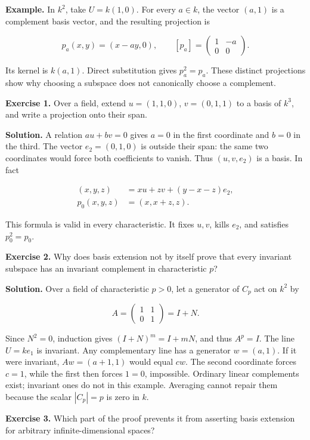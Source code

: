 \documentclass[
  english,
]{article}
\begin{document}
\textbf{Example.} In \(k^2\), take \(U=k(1,0)\). For every \(a\in k\),
the vector \((a,1)\) is a complement basis vector, and the resulting
projection is

\[
p_a(x,y)=(x-ay,0),\qquad
[p_a]=\begin{pmatrix}1&-a\\0&0\end{pmatrix}.
\]

Its kernel is \(k(a,1)\). Direct substitution gives \(p_a^2=p_a\). These
distinct projections show why choosing a subspace does not canonically
choose a complement.

\textbf{Exercise 1.} Over a field, extend \(u=(1,1,0)\), \(v=(0,1,1)\)
to a basis of \(k^3\), and write a projection onto their span.

\textbf{Solution.} A relation \(au+bv=0\) gives \(a=0\) in the first
coordinate and \(b=0\) in the third. The vector \(e_2=(0,1,0)\) is
outside their span: the same two coordinates would force both
coefficients to vanish. Thus \((u,v,e_2)\) is a basis. In fact

\[
\begin{aligned}
(x,y,z)&=xu+zv+(y-x-z)e_2,\\
p_0(x,y,z)&=(x,x+z,z).
\end{aligned}
\]

This formula is valid in every characteristic. It fixes \(u,v\), kills
\(e_2\), and satisfies \(p_0^2=p_0\).

\textbf{Exercise 2.} Why does basis extension not by itself prove that
every invariant subspace has an invariant complement in characteristic
\(p\)?

\textbf{Solution.} Over a field of characteristic \(p>0\), let a
generator of \(C_p\) act on \(k^2\) by

\[
A=\begin{pmatrix}1&1\\0&1\end{pmatrix}=I+N.
\]

Since \(N^2=0\), induction gives \((I+N)^m=I+mN\), and thus \(A^p=I\).
The line \(U=ke_1\) is invariant. Any complementary line has a generator
\(w=(a,1)\). If it were invariant, \(Aw=(a+1,1)\) would equal \(cw\).
The second coordinate forces \(c=1\), while the first then forces
\(1=0\), impossible. Ordinary linear complements exist; invariant ones
do not in this example. Averaging cannot repair them because the scalar
\(|C_p|=p\) is zero in \(k\).

\textbf{Exercise 3.} Which part of the proof prevents it from asserting
basis extension for arbitrary infinite-dimensional spaces?
\end{document}
